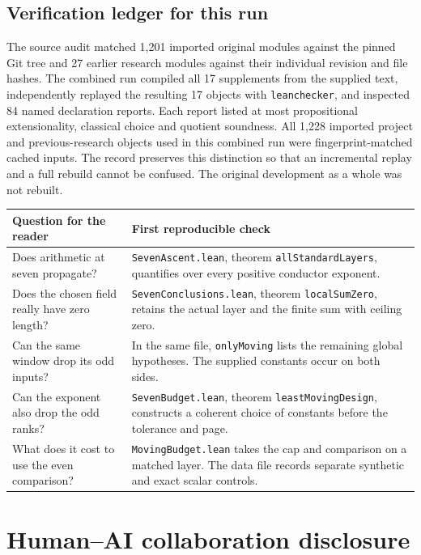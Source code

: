\documentclass[12pt,letterpaper]{article}
\begin{document}
\subsection{Verification ledger for this run}
The source audit matched 1,201 imported original modules against the pinned Git tree and 27 earlier research modules against their individual revision and file hashes. The combined run compiled all 17 supplements from the supplied text, independently replayed the resulting 17 objects with \texttt{leanchecker}, and inspected 84 named declaration reports. Each report listed at most propositional extensionality, classical choice and quotient soundness. All 1,228 imported project and previous-research objects used in this combined run were fingerprint-matched cached inputs. The record preserves this distinction so that an incremental replay and a full rebuild cannot be confused. The original development as a whole was not rebuilt.

\begin{center}\small
\begin{tabularx}{\linewidth}{@{}p{.27\linewidth}Y@{}}\toprule
Question for the reader & First reproducible check\\\midrule
Does arithmetic at seven propagate? & \texttt{SevenAscent.lean}, theorem \texttt{allStandardLayers}, quantifies over every positive conductor exponent.\\
Does the chosen field really have zero length? & \texttt{SevenConclusions.lean}, theorem \texttt{localSumZero}, retains the actual layer and the finite sum with ceiling zero.\\
Can the same window drop its odd inputs? & In the same file, \texttt{onlyMoving} lists the remaining global hypotheses. The supplied constants occur on both sides.\\
Can the exponent also drop the odd ranks? & \texttt{SevenBudget.lean}, theorem \texttt{leastMovingDesign}, constructs a coherent choice of constants before the tolerance and page.\\
What does it cost to use the even comparison? & \texttt{MovingBudget.lean} takes the cap and comparison on a matched layer. The data file records separate synthetic and exact scalar controls.\\\bottomrule
\end{tabularx}\end{center}


\par\medskip
{}
\section*{Human--AI collaboration disclosure}
\label{sec:collaboration}
\end{document}
